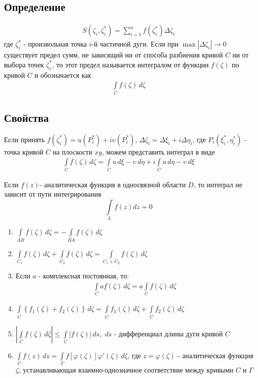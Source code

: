 \documentclass[12pt]{extarticle}
\renewcommand{\v}{\upsilon}
\renewcommand{\d}{\,d}
\begin{document}
\subsection{Определение}
\begin{eqnarray*}
    S(\zeta_{i},\zeta_{i}^{*})=\sum\limits_{i=1}^{n}f(\zeta_{i}^{*})\Delta\zeta_{i}
\end{eqnarray*}
где $\zeta_{i}^{*}$ - произвольная точка $i$-й частичной дуги. Если при
$\max |\Delta\zeta_{i}|\to 0$ существует предел сумм, не зависящий ни от
способа разбиения кривой $C$ ни от выбора точек $\zeta_{i}^{*}$, то этот
предел называется интегралом от функции $f(\zeta)$ по кривой $C$ и
обозначается как
\begin{eqnarray*}
    \int\limits_{C}f(\zeta)\d{\zeta}
\end{eqnarray*}


\subsection{Свойства}
Если принять $f(\zeta_{i}^{*})=u(P_{i}^{*})+i\v(P_{i}^{*})$,
$\Delta\zeta_{i}=\Delta\xi_{i}+i\Delta\eta_{i}$, где
$P_{i}(\xi_{i}^{*},\eta_{i}^{*})$ - точка кривой $C$ на плоскости $xy$,
можем представить интеграл в виде
\begin{eqnarray*}
    \int\limits_{C}f(\zeta)\d{\zeta}
    =\int\limits_{C}u\d{\xi}-\v\d{\eta}
    +i\int\limits_{C}u\d{\eta}-\v\d{\xi}
\end{eqnarray*}

Если $f(z)$- аналитическая функция в односвязной области $D$, то
интеграл не зависит от пути интегрирования
\begin{displaymath}
    \int\limits_{L}f(z)dz = 0
\end{displaymath}

\begin{enumerate}
    \item
        $\int\limits_{AB}f(\zeta)\d{\zeta}=-\int\limits_{BA}f(\zeta)\d{\zeta}$
    \item
        $\int\limits_{C_{1}}f(\zeta)\d{\zeta}+\int\limits_{C_{2}}f(\zeta)\d{\zeta}
        =\int\limits_{C_{1}+C_{2}}f(\zeta)\d{\zeta}$
    \item Если $a$ - комплексная постоянная, то:
        \begin{eqnarray*}
            \int\limits_{C}af(\zeta)\d{\zeta}=a\int\limits_{C}f(\zeta)\d{\zeta}
        \end{eqnarray*}
    \item
        $\int\limits_{C}\left\{f_{1}(\zeta)+f_{2}(\zeta)\right\}\d{\zeta}
        =\int\limits_{C}f_{1}(\zeta)\d{\zeta}+\int\limits_{C}f_{2}(\zeta)\d{\zeta}$
    \item $\left|\int\limits_{C}f(\zeta)\d{\zeta}\right|
        \leqslant \int\limits_{C}\left|f(\zeta)\right|\d{s}$, $\d{s}$ -
        дифференциал длины дуги кривой $C$
    \item
        $\int\limits_{C}f(z)\d{z}=\int\limits_{\Gamma}f[\varphi(\zeta)]\varphi'(\zeta)\d{\zeta}$,
        где $z=\varphi(\zeta)$ - аналитическая функция $\zeta$,
        устанавливающая взаимно-однозначное соответствие между кривыми
        $C$ и $\Gamma$
\end{enumerate}
\end{document}
